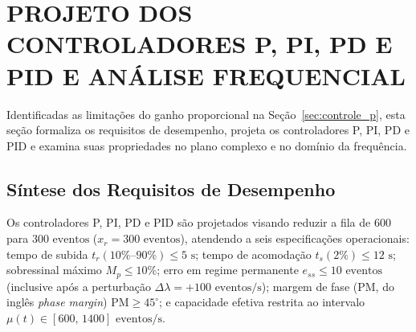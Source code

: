 \section{PROJETO DOS CONTROLADORES P, PI, PD E PID E ANÁLISE FREQUENCIAL}\label{sec:projeto_comp}

Identificadas as limitações do ganho proporcional na Seção~\ref{sec:controle_p}, esta seção formaliza os requisitos de desempenho, projeta os controladores P, PI, PD e PID e examina suas propriedades no plano complexo e no domínio da frequência.

\subsection{Síntese dos Requisitos de Desempenho}\label{sec:requisitos}
Os controladores P, PI, PD e PID são projetados visando reduzir a fila de $600$ para $300\text{ eventos}$ ($x_r = 300\text{ eventos}$), atendendo a seis especificações operacionais: tempo de subida $t_r(10\%\text{--}90\%) \le 5\text{ s}$; tempo de acomodação $t_s(2\%) \le 12\text{ s}$; sobressinal máximo $M_p \le 10\%$; erro em regime permanente $e_{ss} \le 10\text{ eventos}$ (inclusive após a perturbação $\Delta\lambda = +100\text{ eventos/s}$); margem de fase ($\mathrm{PM}$, do inglês \textit{phase margin}) $\mathrm{PM} \ge 45^\circ$; e capacidade efetiva restrita ao intervalo $\mu(t) \in [600,\,1400]\text{ eventos/s}$.

